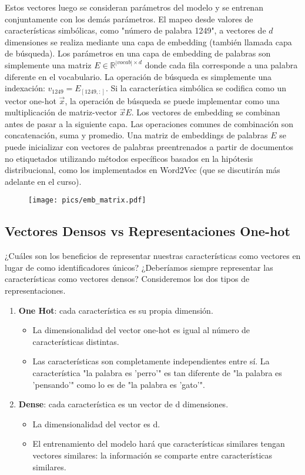Estos vectores luego se consideran parámetros del modelo y se entrenan conjuntamente con los demás parámetros. El mapeo desde valores de características simbólicas, como "número de palabra 1249", a vectores de $d$ dimensiones se realiza mediante una capa de embedding (también llamada capa de búsqueda). Los parámetros en una capa de embedding de palabras son simplemente una matriz $E \in \mathbb{R}^{|vocab|\times d}$ donde cada fila corresponde a una palabra diferente en el vocabulario. La operación de búsqueda es simplemente una indexación: $v_{1249} = E_{[1249,:]}$. Si la característica simbólica se codifica como un vector one-hot $\vec{x}$, la operación de búsqueda se puede implementar como una multiplicación de matriz-vector $\vec{x}E$. Los vectores de embedding se combinan antes de pasar a la siguiente capa. Las operaciones comunes de combinación son concatenación, suma y promedio. Una matriz de embeddings de palabras $E$ se puede inicializar con vectores de palabras preentrenados a partir de documentos no etiquetados utilizando métodos específicos basados en la hipótesis distribucional, como los implementados en Word2Vec (que se discutirán más adelante en el curso).

\begin{figure}[htb]
	\centering
	 \texttt{[image: pics/emb\_matrix.pdf]}
\end{figure}

\subsection{Vectores Densos vs Representaciones One-hot}
¿Cuáles son los beneficios de representar nuestras características como vectores en lugar de como identificadores únicos? ¿Deberíamos siempre representar las características como vectores densos? Consideremos los dos tipos de representaciones.

\begin{enumerate}
 \item \textbf{One Hot}: cada característica es su propia dimensión.
 \begin{itemize}
  \item La dimensionalidad del vector one-hot es igual al número de características distintas.
  \item  Las características son completamente independientes entre sí. La característica "la palabra es 'perro'" es tan diferente de "la palabra es 'pensando'" como lo es de "la palabra es 'gato'".
 \end{itemize}
\item \textbf{Dense}: cada característica es un vector de d dimensiones.
\begin{itemize}
 \item La dimensionalidad del vector es d.
 \item El entrenamiento del modelo hará que características similares tengan vectores similares: la información se comparte entre características similares.
\end{itemize}
\end{enumerate}




